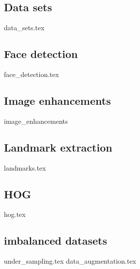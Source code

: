 \subsection{Data sets}
{data_sets.tex}

\subsection{Face detection}
{face_detection.tex}

\subsection{Image enhancements}
{image_enhancements}

\subsection{Landmark extraction}
{landmarks.tex}

\subsection{HOG}
{hog.tex}

\subsection{imbalanced datasets}
{under_sampling.tex}
{data_augmentation.tex}


